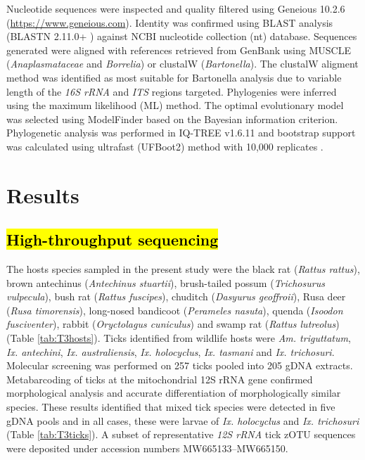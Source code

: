 \documentclass[a4paper, nobind]{templates/ociamthesis}
\begin{document}
Nucleotide sequences were inspected and quality filtered using Geneious 10.2.6 (\url{https://www.geneious.com}).
Identity was confirmed using BLAST analysis (BLASTN 2.11.0+ \autocite{zhangGreedyAlgorithmAligning2000,morgulisDatabaseIndexingProduction2008}) against NCBI nucleotide collection (nt) database.
Sequences generated were aligned with references retrieved from GenBank \autocite{bensonGenBank2017} using MUSCLE \autocite{edgarMUSCLEMultipleSequence2004} (\emph{Anaplasmataceae} and \emph{Borrelia}) or clustalW \autocite{larkinClustalClustalVersion2007} (\emph{Bartonella}).
The clustalW aligment method was identified as most suitable for Bartonella analysis due to variable length of the \emph{16S rRNA} and \emph{ITS} regions targeted.
Phylogenies were inferred using the maximum likelihood (ML) method.
The optimal evolutionary model was selected using ModelFinder \autocite{kalyaanamoorthyModelFinderFastModel2017} based on the Bayesian information criterion. Phylogenetic analysis was performed in IQ-TREE v1.6.11 \autocite{nguyenIQTREEFastEffective2015} and bootstrap support was calculated using ultrafast (UFBoot2) method with 10,000 replicates \autocite{hoangUFBoot2ImprovingUltrafast2018}.

\hypertarget{results}{%
\section{Results}\label{results}}

\hypertarget{high-throughput-sequencing}{%
\subsection{\texorpdfstring{\hl{High-throughput sequencing}}{High-throughput sequencing}}\label{high-throughput-sequencing}}

The hosts species sampled in the present study were the black rat (\emph{Rattus rattus}), brown antechinus (\emph{Antechinus stuartii}), brush-tailed possum (\emph{Trichosurus vulpecula}), bush rat (\emph{Rattus fuscipes}), chuditch (\emph{Dasyurus geoffroii}), Rusa deer (\emph{Rusa timorensis}), long-nosed bandicoot (\emph{Perameles nasuta}), quenda (\emph{Isoodon fusciventer}), rabbit (\emph{Oryctolagus cuniculus}) and swamp rat (\emph{Rattus lutreolus}) (Table \ref{tab:T3hosts}).
Ticks identified from wildlife hosts were \emph{Am. triguttatum}, \emph{Ix. antechini}, \emph{Ix. australiensis}, \emph{Ix. holocyclus}, \emph{Ix. tasmani} and \emph{Ix. trichosuri}.
Molecular screening was performed on 257 ticks pooled into 205 gDNA extracts.
Metabarcoding of ticks at the mitochondrial 12S rRNA gene confirmed morphological analysis and accurate differentiation of morphologically similar species.
These results identified that mixed tick species were detected in five gDNA pools and in all cases, these were larvae of \emph{Ix. holocyclus} and \emph{Ix. trichosuri} (Table \ref{tab:T3ticks}).
A subset of representative \emph{12S rRNA} tick zOTU sequences were deposited under accession numbers MW665133--MW665150.
\end{document}
